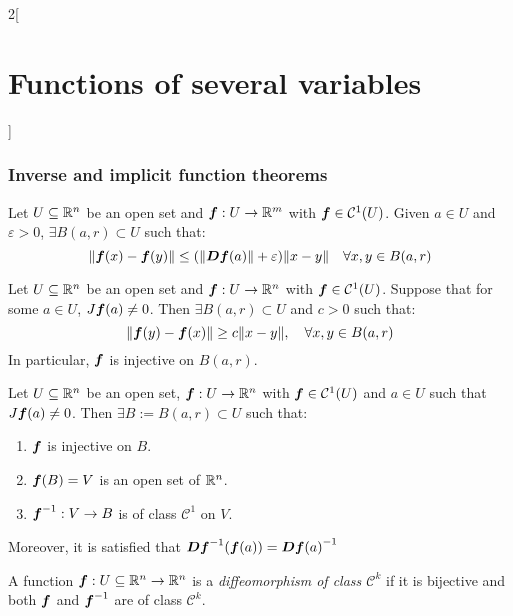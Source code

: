 \documentclass[../../../main.tex]{subfiles}
\begin{document}
\begin{multicols}{2}[\section{Functions of several variables}]
  \subsubsection*{Inverse and implicit function theorems}
  \begin{lemma}
    Let $U\subseteq\mathbb{R}^n$ be an open set and $\boldsymbol{f}:U\rightarrow\mathbb{R}^m$ with $\boldsymbol{f}\in \mathcal{C}^1(U)$. Given $a\in U$ and $\varepsilon>0$, $\exists B(a,r)\subset U$ such that: $$\|\boldsymbol{f}(x)-\boldsymbol{f}(y)\|\leq(\|\boldsymbol{Df}(a)\|+\varepsilon)\|x-y\|\quad\forall x,y\in B(a,r)$$
  \end{lemma}
  \begin{lemma}
    Let $U\subseteq\mathbb{R}^n$ be an open set and $\boldsymbol{f}:U\rightarrow\mathbb{R}^n$ with $\boldsymbol{f}\in \mathcal{C}^1(U)$. Suppose that for some $a\in U$, $J\boldsymbol{f}(a)\ne 0$. Then $\exists B(a,r)\subset U$ and $c>0$ such that: $$\|\boldsymbol{f}(y)-\boldsymbol{f}(x)\|\geq c\|x-y\|,\quad\forall x,y\in B(a,r)$$ In particular, $\boldsymbol{f}$ is injective on $B(a,r)$.
  \end{lemma}
  \begin{theorem}
    Let $U\subseteq\mathbb{R}^n$ be an open set, $\boldsymbol{f}:U\rightarrow\mathbb{R}^n$ with $\boldsymbol{f}\in \mathcal{C}^1(U)$ and $a\in U$ such that $J\boldsymbol{f}(a)\ne0$. Then $\exists B:=B(a,r)\subset U$ such that:
    \begin{enumerate}
      \item $\boldsymbol{f}$ is injective on $B$.
      \item $\boldsymbol{f}(B)=V$ is an open set of $\mathbb{R}^n$.
      \item $\boldsymbol{f}^{-1}:V\rightarrow B$ is of class $\mathcal{C}^1$ on $V$.
    \end{enumerate} Moreover, it is satisfied that $\boldsymbol{D}{\boldsymbol{f}}^{-1}(\boldsymbol{f}(a))={\boldsymbol{Df}(a)}^{-1}$
  \end{theorem}
  \begin{definition}
    A function $\boldsymbol{f}:U\subseteq\mathbb{R}^n\rightarrow\mathbb{R}^n$ is a \textit{diffeomorphism of class $\mathcal{C}^k$} if it is bijective and both $\boldsymbol{f}$ and $\boldsymbol{f}^{-1}$ are of class $\mathcal{C}^k$.
  \end{definition}
  \begin{theorem}

\end{theorem}
\end{multicols}
\end{document}
